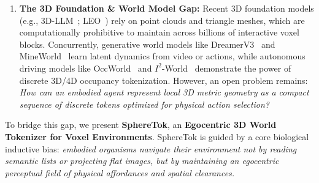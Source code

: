 \documentclass[10pt,twocolumn,letterpaper]{article}
\begin{document}
\begin{enumerate}[leftmargin=*]
    \item \textbf{The 3D Foundation \& World Model Gap:} Recent 3D foundation models (e.g., 3D-LLM~\cite{hong20233dllm}; LEO~\cite{huang2024leo}) rely on point clouds and triangle meshes, which are computationally prohibitive to maintain across billions of interactive voxel blocks. Concurrently, generative world models like DreamerV3~\cite{hafner2023dreamerv3} and MineWorld~\cite{mineworld2025} learn latent dynamics from video or actions, while autonomous driving models like OccWorld~\cite{zheng2023occworld} and $I^2$-World~\cite{isquaredworld2025} demonstrate the power of discrete 3D/4D occupancy tokenization. However, an open problem remains: \textit{How can an embodied agent represent local 3D metric geometry as a compact sequence of discrete tokens optimized for physical action selection?}
\end{enumerate}

To bridge this gap, we present \textbf{SphereTok}, an \textbf{Egocentric 3D World Tokenizer for Voxel Environments}. SphereTok is guided by a core biological inductive bias: \textit{embodied organisms navigate their environment not by reading semantic lists or projecting flat images, but by maintaining an egocentric perceptual field of physical affordances and spatial clearances.}
\end{document}
